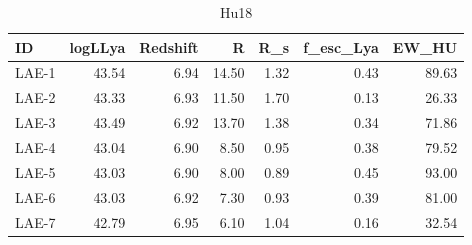 \begin{table}[H]
\caption{Hu18}
\label{Hu18}
\begin{tabular}{lrrrrrr}
\toprule
ID & logLLya & Redshift & R & R_s & f_esc_Lya & EW_HU \\
\midrule
LAE-1 & 43.54 & 6.94 & 14.50 & 1.32 & 0.43 & 89.63 \\
LAE-2 & 43.33 & 6.93 & 11.50 & 1.70 & 0.13 & 26.33 \\
LAE-3 & 43.49 & 6.92 & 13.70 & 1.38 & 0.34 & 71.86 \\
LAE-4 & 43.04 & 6.90 & 8.50 & 0.95 & 0.38 & 79.52 \\
LAE-5 & 43.03 & 6.90 & 8.00 & 0.89 & 0.45 & 93.00 \\
LAE-6 & 43.03 & 6.92 & 7.30 & 0.93 & 0.39 & 81.00 \\
LAE-7 & 42.79 & 6.95 & 6.10 & 1.04 & 0.16 & 32.54 \\
\bottomrule
\end{tabular}
\end{table}
